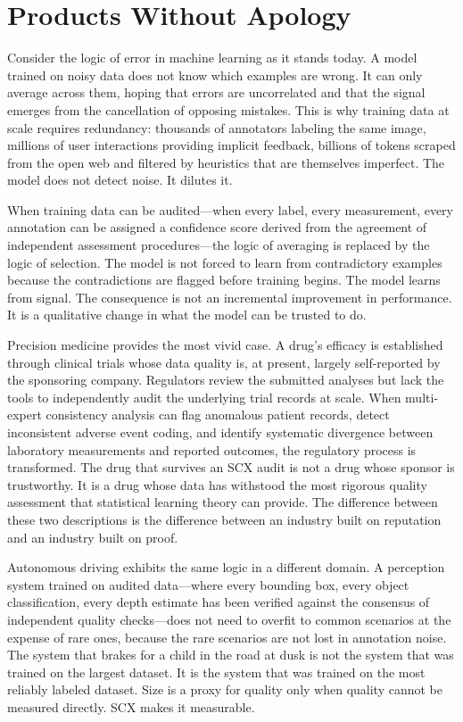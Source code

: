 \documentclass[12pt,a4paper]{article}
\begin{document}
\section{Products Without Apology}

Consider the logic of error in machine learning as it stands today. A model trained on noisy data does not know which examples are wrong. It can only average across them, hoping that errors are uncorrelated and that the signal emerges from the cancellation of opposing mistakes. This is why training data at scale requires redundancy: thousands of annotators labeling the same image, millions of user interactions providing implicit feedback, billions of tokens scraped from the open web and filtered by heuristics that are themselves imperfect. The model does not detect noise. It dilutes it.

When training data can be audited---when every label, every measurement, every annotation can be assigned a confidence score derived from the agreement of independent assessment procedures---the logic of averaging is replaced by the logic of selection. The model is not forced to learn from contradictory examples because the contradictions are flagged before training begins. The model learns from signal. The consequence is not an incremental improvement in performance. It is a qualitative change in what the model can be trusted to do.

Precision medicine provides the most vivid case. A drug's efficacy is established through clinical trials whose data quality is, at present, largely self-reported by the sponsoring company. Regulators review the submitted analyses but lack the tools to independently audit the underlying trial records at scale. When multi-expert consistency analysis can flag anomalous patient records, detect inconsistent adverse event coding, and identify systematic divergence between laboratory measurements and reported outcomes, the regulatory process is transformed. The drug that survives an SCX audit is not a drug whose sponsor is trustworthy. It is a drug whose data has withstood the most rigorous quality assessment that statistical learning theory can provide. The difference between these two descriptions is the difference between an industry built on reputation and an industry built on proof.

Autonomous driving exhibits the same logic in a different domain. A perception system trained on audited data---where every bounding box, every object classification, every depth estimate has been verified against the consensus of independent quality checks---does not need to overfit to common scenarios at the expense of rare ones, because the rare scenarios are not lost in annotation noise. The system that brakes for a child in the road at dusk is not the system that was trained on the largest dataset. It is the system that was trained on the most reliably labeled dataset. Size is a proxy for quality only when quality cannot be measured directly. SCX makes it measurable.
\end{document}
